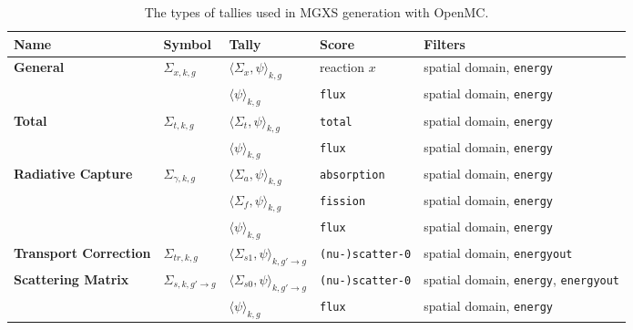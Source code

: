 \begin{table}[h!]
  \centering
  \caption[Tally types for MGXS generation]{The types of tallies used in MGXS generation with OpenMC.}
  \scriptsize
  \label{tab:tally-types}
  \vspace{6pt}
  \begin{tabular}{ m{2.3cm} m{1.2cm} m{2cm} m{2.5cm} l }
  \toprule
  {\bf Name} &
  {\bf Symbol} &
  {\bf Tally} &
  {\bf Score} &
  {\bf Filters} \\

  \midrule

  \multirow{2}{*}{\bf General} & \multirow{2}{*}{$\Sigma_{x,k,g}$} & $\langle \Sigma_{x}, \psi \rangle_{k,g}$ & reaction $x$ & spatial domain, \texttt{energy} \\
  \cline{3-5}
  & & $\langle \psi \rangle_{k,g}$ & {\texttt{flux}} & spatial domain, \texttt{energy} \\

  \midrule

  \multirow{2}{*}{\bf Total} & \multirow{2}{*}{$\Sigma_{t,k,g}$} & $\langle \Sigma_{t}, \psi \rangle_{k,g}$ & \texttt{total} & spatial domain, \texttt{energy} \\
  \cline{3-5}
  & & $\langle \psi \rangle_{k,g}$ & \texttt{flux} & spatial domain, \texttt{energy} \\

  \midrule

  \multirow{3}{*}{\parbox{1.5cm}{\bf Radiative Capture}} & \multirow{3}{*}{$\Sigma_{\gamma,k,g}$} & $\langle \Sigma_{a}, \psi \rangle_{k,g}$ & \texttt{absorption} & spatial domain, \texttt{energy} \\
  \cline{3-5}
  & & $\langle \Sigma_{f}, \psi \rangle_{k,g}$ & \texttt{fission} & spatial domain, \texttt{energy} \\
  \cline{3-5}
  & & $\langle \psi \rangle_{k,g}$ & \texttt{flux} & spatial domain, \texttt{energy} \\

  \midrule

  \textbf{\parbox{1.5cm}{\bf Transport Correction}} & $\Sigma_{tr,k,g}$ & $\langle \Sigma_{s1}, \psi \rangle_{k,g'\rightarrow g}$ & \texttt{(nu-)scatter-0} & spatial domain, \texttt{energyout} \\

  \midrule

  \multirow{2}{*}{\parbox{1.5cm}{\bf Scattering Matrix}} & \multirow{2}{*}{$\Sigma_{s,k,g'\rightarrow g}$} & $\langle \Sigma_{s0}, \psi \rangle_{k,g'\rightarrow g}$ & \texttt{(nu-)scatter-0} & spatial domain, \texttt{energy}, \texttt{energyout} \\
  \cline{3-5}
  & & $\langle \psi \rangle_{k,g}$ & \texttt{flux} & spatial domain, \texttt{energy} \\


\end{tabular}
\end{table}
